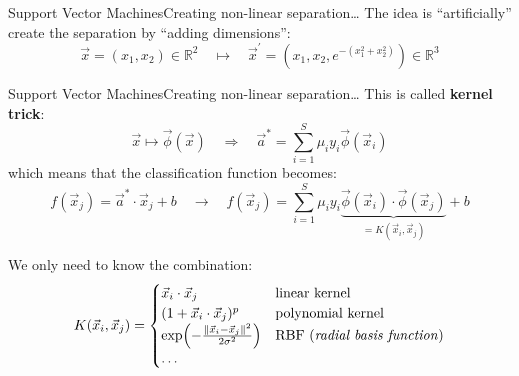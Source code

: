 \begin{frame}{Support Vector Machines}{Creating non-linear separation\dots}
    The idea is \enquote{artificially} create the separation by \enquote{adding dimensions}:
    \begin{equation*}
        \vec{x} = (x_1, x_2) \in \mathbb{R}^2
        \quad \longmapsto \quad
        \vec{x}^{\prime} = (x_1, x_2, e^{-(x_1^2 + x_2^2)}) \in \mathbb{R}^3
    \end{equation*}

    \vfill

    \begin{center}
        
    \end{center}
\end{frame}

\begin{frame}{Support Vector Machines}{Creating non-linear separation\dots}
    This is called \textbf{kernel trick}:
    \begin{equation*}
        \vec{x} \mapsto \vec{\phi}(\vec{x})
        \quad \Rightarrow \quad
        \vec{a}^*
        =
        \sum\limits_{i = 1}^S \mu_i y_i \vec{\phi}(\vec{x}_i)
    \end{equation*}
    which means that the classification function becomes:
    \begin{equation*}
        f(\vec{x}_j)
        =
        \vec{a}^* \cdot \vec{x}_j + b
        \quad \longrightarrow \quad
        f(\vec{x}_j)
        =
        \sum\limits_{i = 1}^S \mu_i y_i \underbrace{\vec{\phi}(\vec{x}_i) \cdot \vec{\phi}(\vec{x}_j)}_{= K(\vec{x}_i, \vec{x}_j)} + b
    \end{equation*}

    \vfill \pause

    We only need to know the combination:
    \begin{equation*}
        K(\vec{x}_i, \vec{x}_j)
        =
        \begin{cases}
            \vec{x}_i \cdot \vec{x}_j                                & \text{linear kernel}                      \\
            (1 + \vec{x}_i \cdot \vec{x}_j)^p                        & \text{polynomial kernel}                  \\
            \exp(-\frac{\norm{\vec{x}_i - \vec{x}_j}^2}{2 \sigma^2}) & \text{RBF (\emph{radial basis function})} \\
            \dots
        \end{cases}
    \end{equation*}
\end{frame}

